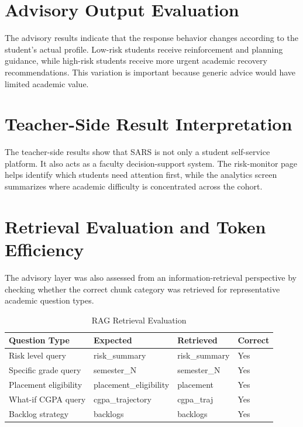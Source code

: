 \section{Advisory Output Evaluation}
The advisory results indicate that the response behavior changes according to the student's actual profile. Low-risk students receive reinforcement and planning guidance, while high-risk students receive more urgent academic recovery recommendations. This variation is important because generic advice would have limited academic value.

\section{Teacher-Side Result Interpretation}
The teacher-side results show that SARS is not only a student self-service platform. It also acts as a faculty decision-support system. The risk-monitor page helps identify which students need attention first, while the analytics screen summarizes where academic difficulty is concentrated across the cohort.

\section{Retrieval Evaluation and Token Efficiency}
The advisory layer was also assessed from an information-retrieval perspective by checking whether the correct chunk category was retrieved for representative academic question types.

\begin{table}[H]
\centering
\caption{RAG Retrieval Evaluation}
\begin{tabular}{llll}
\toprule
\textbf{Question Type} & \textbf{Expected} & \textbf{Retrieved} & \textbf{Correct} \\
\midrule
Risk level query & risk\_summary & risk\_summary & Yes \\
Specific grade query & semester\_N & semester\_N & Yes \\
Placement eligibility & placement\_eligibility & placement & Yes \\
What-if CGPA query & cgpa\_trajectory & cgpa\_traj & Yes \\
Backlog strategy & backlogs & backlogs & Yes \\
\bottomrule
\end{tabular}
\end{table}

